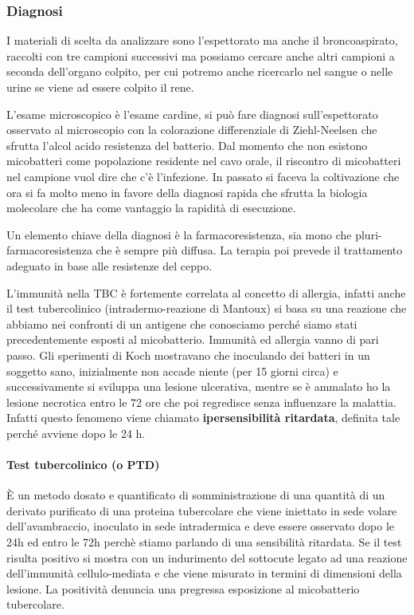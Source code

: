 \subsubsection{Diagnosi}


I materiali di scelta da analizzare sono l'espettorato ma anche il
broncoaspirato, raccolti con tre campioni successivi ma possiamo cercare
anche altri campioni a seconda dell'organo colpito, per cui potremo
anche ricercarlo nel sangue o nelle urine se viene ad essere colpito il
rene.

L'esame microscopico è l'esame cardine, si può fare diagnosi
sull'espettorato osservato al microscopio con la colorazione
differenziale di Ziehl-Neelsen che sfrutta l'alcol acido resistenza del
batterio. Dal momento che non esistono micobatteri come popolazione
residente nel cavo orale, il riscontro di micobatteri nel campione vuol
dire che c'è l'infezione. In passato si faceva la coltivazione che ora
si fa molto meno in favore della diagnosi rapida che sfrutta la biologia
molecolare che ha come vantaggio la rapidità di esecuzione.

Un elemento chiave della diagnosi è la farmacoresistenza, sia mono che
pluri-farmacoresistenza che è sempre più diffusa. La terapia poi prevede
il trattamento adeguato in base alle resistenze del ceppo.

L'immunità nella TBC è fortemente correlata al concetto di allergia,
infatti anche il test tubercolinico (intradermo-reazione di Mantoux) si
basa su una reazione che abbiamo nei confronti di un antigene che
conosciamo perché siamo stati precedentemente esposti al micobatterio.
Immunità ed allergia vanno di pari passo. Gli sperimenti di Koch
mostravano che inoculando dei batteri in un soggetto sano, inizialmente
non accade niente (per 15 giorni circa) e successivamente si sviluppa
una lesione ulcerativa, mentre se è ammalato ho la lesione necrotica
entro le 72 ore che poi regredisce senza influenzare la malattia.
Infatti questo fenomeno viene chiamato \textbf{ipersensibilità
ritardata}, definita tale perché avviene dopo le 24 h.

\paragraph{Test tubercolinico (o PTD)}


È un metodo dosato e quantificato di somministrazione di una quantità di
un derivato purificato di una proteina tubercolare che viene iniettato
in sede volare dell'avambraccio, inoculato in sede intradermica e deve
essere osservato dopo le 24h ed entro le 72h perchè stiamo parlando di
una sensibilità ritardata. Se il test risulta positivo si mostra con un
indurimento del sottocute legato ad una reazione dell'immunità
cellulo-mediata e che viene misurato in termini di dimensioni della
lesione. La positività denuncia una pregressa esposizione al
micobatterio tubercolare.

